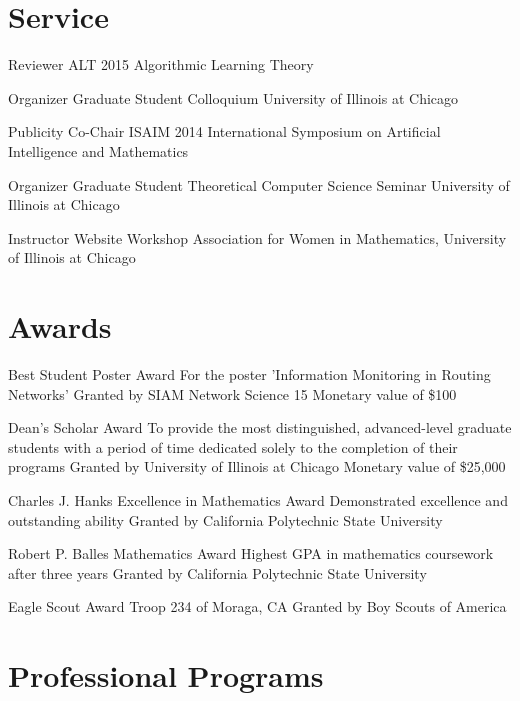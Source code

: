 \documentclass[11pt]{moderncv}
\begin{document}
\section{Service}

  {Reviewer}
  {ALT 2015}
  {Algorithmic Learning Theory}
  {}
  {}

  {Organizer}
  {Graduate Student Colloquium}
  {University of Illinois at Chicago}
  {}
  {}

  {Publicity Co-Chair}
  {ISAIM 2014}
  {International Symposium on Artificial Intelligence and Mathematics}
  {}
  {}

  {Organizer}
  {Graduate Student Theoretical Computer Science Seminar}
  {University of Illinois at Chicago}
  {}
  {}

  {Instructor}
  {Website Workshop}
  {Association for Women in Mathematics, University of Illinois at Chicago}
  {}
  {}

\section{Awards}

  {Best Student Poster Award}
  {For the poster 'Information Monitoring in Routing Networks'}
  {Granted by SIAM Network Science 15}
  {}
  {Monetary value of \$100}


  {Dean's Scholar Award}
  {To provide the most distinguished, advanced-level graduate students with a period of time dedicated solely to the completion of their programs}
  {Granted by University of Illinois at Chicago}
  {}
  {Monetary value of \$25,000}


  {Charles J. Hanks Excellence in Mathematics Award}
  {Demonstrated excellence and outstanding ability}
  {Granted by California Polytechnic State University}
  {}
  {}


  {Robert P. Balles Mathematics Award}
  {Highest GPA in mathematics coursework after three years}
  {Granted by California Polytechnic State University}
  {}
  {}


  {Eagle Scout Award}
  {Troop 234 of Moraga, CA}
  {Granted by Boy Scouts of America}
  {}
  {}


\section{Professional Programs}
\end{document}
